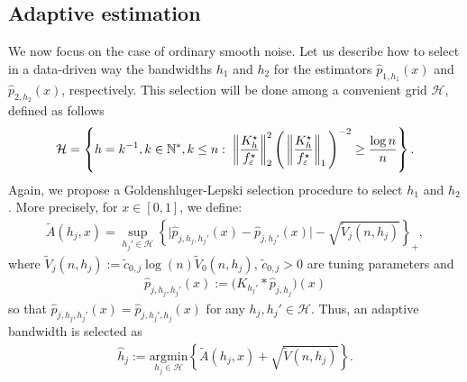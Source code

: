 \documentclass[11pt,a4paper,openany]{article}
\begin{document}
\subsection{Adaptive estimation %
}
\label{sec:adaptive:oracle-inequalities.rate-convergence:m}


We now focus on  the case of ordinary smooth noise. Let us describe how to select in a data-driven way the bandwidths $h_1$ and $h_2$ for the estimators $\widehat{p}_{1,h_1}(x)$ and $\widehat{p}_{2,h_2}(x)$, respectively. This selection will be done among a convenient grid $\mathcal{H}$, defined as follows    
\begin{align}
	\mathcal{H} =   \left\{  h  =  k^{-1}      
 ,  k \in \mathbb{N}^{*} , k  \leq n : 	%
\hspace{0.1cm}  \left\| \dfrac{K^{\star}_{h} }{ f_{\varepsilon}^{\star} }   \right\|^2_{2}   \Bigg( \left\| \dfrac{K^{\star}_{h} }{ f_{\varepsilon}^{\star} }   \right\|_{1} \Bigg)^{-2}  \geq  \dfrac{\log n}{n}    
	\right\} .  
	\label{def:bandwidth.colletion.H_n}
\end{align}    
Again, we propose a  Goldenshluger-Lepski selection procedure to select ${h}_{1}$ and ${h}_{2}$. More precisely,  for $x \in [0,1]$, we define:
\begin{align*}  
\widetilde A(h_{j},x )  = \sup_{h_{j} '\in \mathcal{H}} \left\{ \big| \widehat{p}_{j, h_{j} , h_{j}'}(x) -  \widehat{p}_{j, h_{j}'}(x) \big| - \sqrt{ \widetilde{V}_{j}(n,h_{j}) }  \right\}_{+}, 
\end{align*}  
where $ \widetilde{V}_{j}(n,h_{j}) :=   \tilde c_{0,j}   \log (n)    \widetilde V_{0}(n,h_{j})$, $\tilde c_{0,j} > 0$ are tuning parameters and \begin{align*}
\widehat{p}_{j , h_{j} , h_{j}'}(x) := \big( K_{h_{j}'} \ast \widehat{p}_{j , h_{j}} \big)(x) 
\end{align*}
so that $\widehat{p}_{j,h_{j},h_{j}'}(x) = \widehat{p}_{j , h_{j}' , h_{j}}(x)$ for any $h_{j}, h_{j}' \in \mathcal{H}$.  
Thus, an adaptive bandwidth is selected as     
\begin{align}   
\widehat{h}_{j} := \underset{h_{j} \in \mathcal{H}}{\textrm{argmin}} \left\{  \widetilde A(h_{j}, x) + \sqrt{  \widetilde{V}(n,h_{j})  }  \right\}  .    
\label{equa:adaptive.selection.h1-h2:form}
\end{align}    
\end{document}
